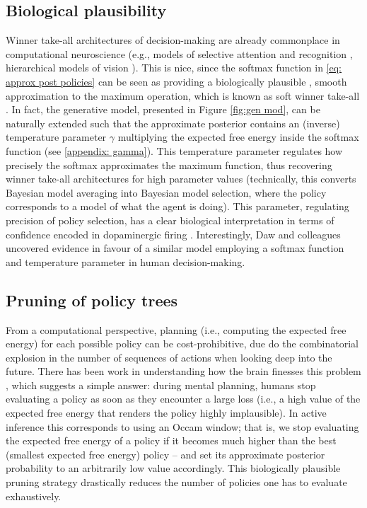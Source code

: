 \documentclass[review,12pt,authoryear]{elsarticle}
\begin{document}
\subsection{Biological plausibility}

Winner take-all architectures of decision-making are already commonplace in computational neuroscience (e.g., models of selective attention and recognition \citep{carpenterMassivelyParallelArchitecture1987,ittiModelSaliencybasedVisual1998}, hierarchical models of vision \citep{riesenhuberHierarchicalModelsObject1999}).
This is nice, since the softmax function in \eqref{eq: approx post policies} can be seen as providing a biologically plausible \citep{marreirosPopulationDynamicsVariance2008,decoDynamicBrainSpiking2008,moranNeuralMassesFields2013}, smooth approximation to the maximum operation, which is known as soft winner take-all \citep{maassComputationalPowerWinnerTakeAll2000}. In fact, the generative model, presented in Figure \ref{fig:gen mod}, can be naturally extended such that the approximate posterior contains an (inverse) temperature parameter $\gamma$ multiplying the expected free energy inside the softmax function (see \ref{appendix: gamma}). This temperature parameter regulates how precisely the softmax approximates the maximum function, thus recovering winner take-all architectures for high parameter values (technically, this converts Bayesian model averaging into Bayesian model selection, where the policy corresponds to a model of what the agent is doing). This parameter, regulating precision of policy selection, has a clear biological interpretation in terms of confidence encoded in dopaminergic firing \citep{fitzgeraldDopamineRewardLearning2015,fristonAnatomyChoiceDopamine2014,schwartenbeckDopaminergicMidbrainEncodes2015,fristonActiveInferenceProcess2017}. Interestingly, Daw and colleagues \citep{dawCorticalSubstratesExploratory2006} uncovered evidence in favour of a similar model employing a softmax function and temperature parameter in human decision-making.

\subsection{Pruning of policy trees}

From a computational perspective, planning (i.e., computing the expected free energy) for each possible policy can be cost-prohibitive, due do the combinatorial explosion in the number of sequences of actions when looking deep into the future. There has been work in understanding how the brain finesses this problem \citep{huysBonsaiTreesYour2012}, which suggests a simple answer: during mental planning, humans stop evaluating a policy as soon as they encounter a large loss (i.e., a high value of the expected free energy that renders the policy highly implausible). In active inference this corresponds to using an Occam window; that is, we stop evaluating the expected free energy of a policy if it becomes much higher than the best (smallest expected free energy) policy -- and set its approximate posterior probability to an arbitrarily low value accordingly. This biologically plausible pruning strategy drastically reduces the number of policies one has to evaluate exhaustively.
\end{document}
